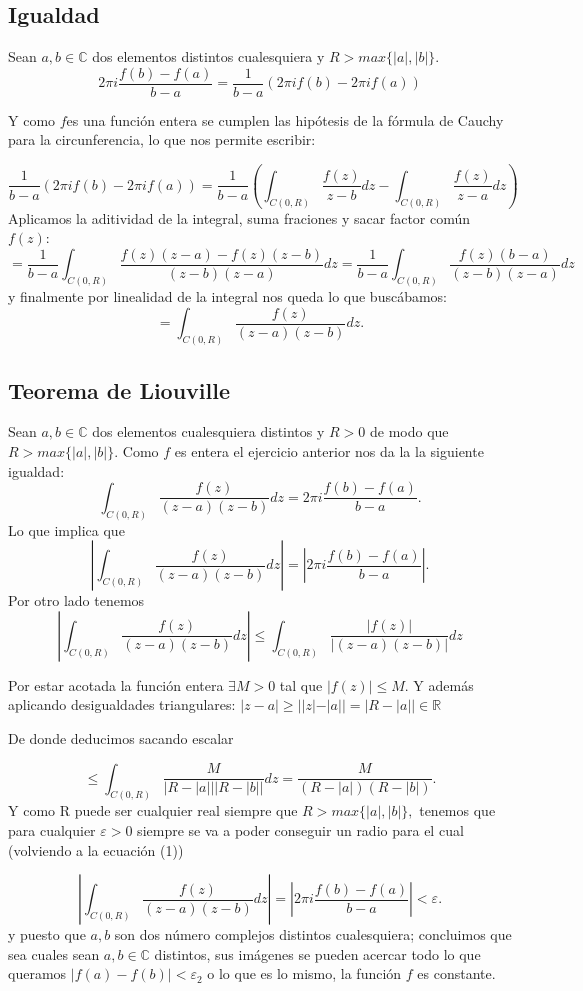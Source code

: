 \documentclass[12pt]{article}
\begin{document}
\subsection{Igualdad}
Sean $a,b  \in \mathbb C$ dos elementos distintos cualesquiera y $R>max\{|a|,|b|\}.$ 
$$ 2\pi i \frac{f(b)-f(a)}{b-a} = \frac{1}{b-a}(2\pi i f(b) - 2\pi i f(a))$$

Y como $f$es una función entera se cumplen las hipótesis de la fórmula de Cauchy para la circunferencia, 
lo que nos permite escribir: 

$$\frac{1}{b-a}(2\pi i f(b) - 2\pi i f(a)) = \frac{1}{b-a}\left( \int_{C(0,R)} \frac{f(z)}{z-b}dz - \int_{C(0,R)} \frac{f(z)}{z-a}dz\right)$$
Aplicamos la aditividad de la integral, suma fraciones y sacar factor común $f(z)$: 
$$=\frac{1}{b-a} \int_{C(0,R)} \frac{f(z)(z-a)-f(z)(z-b)}{(z-b)(z-a)}dz =
\frac{1}{b-a} \int_{C(0,R)} \frac{f(z)(b-a)}{(z-b)(z-a)}dz$$
y finalmente por linealidad de la integral nos queda lo que buscábamos: 
$$=\int_{C(0,R)} \frac{f(z)}{(z-a)(z-b)}dz.$$

\subsection{Teorema de Liouville}
Sean $a,b  \in \mathbb C$ dos elementos cualesquiera distintos y $R >0$ de modo que $R>max\{|a|,|b|\}.$
Como $f$ es entera el ejercicio anterior nos da la la siguiente igualdad: 
$$\int_{C(0,R)} \frac{f(z)}{(z-a)(z-b)}dz = 2\pi i \frac{f(b)-f(a)}{b-a}.$$
Lo que implica que 
\begin{equation}
\left|\int_{C(0,R)} \frac{f(z)}{(z-a)(z-b)}dz \right|= \left| 2\pi i \frac{f(b)-f(a)}{b-a}\right|.
\end{equation}
Por otro lado tenemos
$$\left|\int_{C(0,R)} \frac{f(z)}{(z-a)(z-b)}dz \right| \leq 
 \int_{C(0,R)} \frac{|f(z)|}{|(z-a)(z-b)|}dz$$

Por estar acotada la función entera $\exists M >0$ tal que $|f(z)|\leq M$. 
Y además aplicando desigualdades triangulares: 
$|z-a| \geq ||z|-|a|| = |R-|a|| \in \mathbb R$

De donde deducimos sacando escalar

$$\leq\int_{C(0,R)} \frac{M}{|R-|a|| |R-|b||}dz = \frac{M}{(R-|a|)(R-|b|)}.$$
Y como R puede ser cualquier real siempre que $R>max\{|a|,|b|\},$ 
tenemos que para cualquier $\varepsilon >0$ siempre se va a poder conseguir un radio 
para el cual (volviendo a la ecuación (1))

$$\left|\int_{C(0,R)} \frac{f(z)}{(z-a)(z-b)}dz  \right| = \left|2\pi i \frac{f(b)-f(a)}{b-a}\right| < \varepsilon.$$
y puesto que $a,b$ son dos número complejos distintos cualesquiera; concluimos que
sea cuales sean $a,b \in \mathbb C$ distintos, sus imágenes se pueden 
 acercar todo lo que queramos  $|f(a)-f(b)| < \varepsilon_2$ o lo que es lo mismo, 
la función $f$ es constante. 
\end{document}
